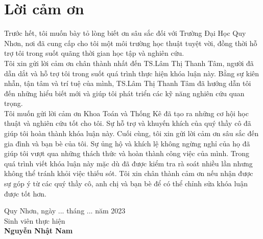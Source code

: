 \documentclass[12pt,a4paper,oneside]{report}
\numberwithin{equation}{section}
\begin{document}
\chapter*{Lời cảm ơn}
\begin{justify}
%

Trước hết, tôi muốn bày tỏ lòng biết ơn sâu sắc đối với Trường Đại Học Quy Nhơn, nơi đã cung cấp cho tôi một môi trường học thuật tuyệt vời, đồng thời hỗ trợ tôi trong suốt quãng thời gian học tập và nghiên cứu.\\
Tôi xin gửi lời cảm ơn chân thành nhất đến TS.Lâm Thị Thanh Tâm, người đã dẫn dắt và hỗ trợ tôi trong suốt quá trình thực hiện khóa luận này. Bằng sự kiên nhẫn, tận tâm và trí tuệ của mình, TS.Lâm Thị Thanh Tâm đã hướng dẫn tôi đến những hiểu biết mới và giúp tôi phát triển các kỹ năng nghiên cứu quan trọng.\\
Tôi muốn gửi lời cảm ơn Khoa Toán và Thống Kê đã tạo ra những cơ hội học thuật và nghiên cứu tốt cho tôi. Sự hỗ trợ và khuyến khích của quý thầy cô đã giúp tôi hoàn thành khóa luận này. Cuối cùng, tôi xin gửi lời cảm ơn sâu sắc đến gia đình và bạn bè của tôi. Sự ủng hộ và khích lệ không ngừng nghỉ của họ đã giúp tôi vượt qua những thách thức và hoàn thành công việc của mình.
Trong quá trình viết khóa luận này mặc dù đã được kiểm tra rà soát nhiều lần nhưng không thể tránh khỏi việc thiếu sót. Tôi xin chân thành cảm ơn nếu nhận được sự góp ý từ các quý thầy cô, anh chị và bạn bè để có thể chỉnh sửa khóa luận được tốt hơn.
\end{justify}
\vskip 0.5cm
\begin{flushright}
Quy Nhơn, ngày ... tháng ... năm 2023\qquad\\
Sinh viên thực hiện\qquad\qquad\qquad\qquad\\

\vskip 2.5cm
\textbf{  Nguyễn Nhật Nam}\qquad\quad\quad\quad\qquad\\
\end{flushright}
\end{document}
